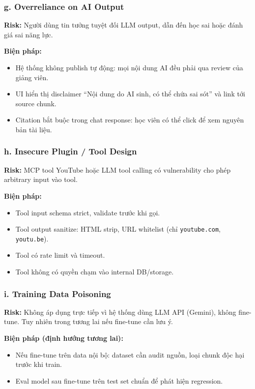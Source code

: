 \subsubsection*{g. Overreliance on AI Output}

\textbf{Risk:} Người dùng tin tưởng tuyệt đối LLM output, dẫn đến học sai
hoặc đánh giá sai năng lực.

\textbf{Biện pháp:}
\begin{itemize}
    \item Hệ thống không publish tự động: mọi nội dung AI đều phải qua
          review của giảng viên.
    \item UI hiển thị disclaimer ``Nội dung do AI sinh, có thể chứa sai
          sót'' và link tới source chunk.
    \item Citation bắt buộc trong chat response: học viên có thể click để
          xem nguyên bản tài liệu.
\end{itemize}

\subsubsection*{h. Insecure Plugin / Tool Design}

\textbf{Risk:} MCP tool YouTube hoặc LLM tool calling có vulnerability cho
phép arbitrary input vào tool.

\textbf{Biện pháp:}
\begin{itemize}
    \item Tool input schema strict, validate trước khi gọi.
    \item Tool output sanitize: HTML strip, URL whitelist (chỉ
          \texttt{youtube.com}, \texttt{youtu.be}).
    \item Tool có rate limit và timeout.
    \item Tool không có quyền chạm vào internal DB/storage.
\end{itemize}

\subsubsection*{i. Training Data Poisoning}

\textbf{Risk:} Không áp dụng trực tiếp vì hệ thống dùng LLM API (Gemini), không
fine-tune. Tuy nhiên trong tương lai nếu fine-tune cần lưu ý.

\textbf{Biện pháp (định hướng tương lai):}
\begin{itemize}
    \item Nếu fine-tune trên data nội bộ: dataset cần audit nguồn, loại
          chunk độc hại trước khi train.
    \item Eval model sau fine-tune trên test set chuẩn để phát hiện
          regression.
\end{itemize}

